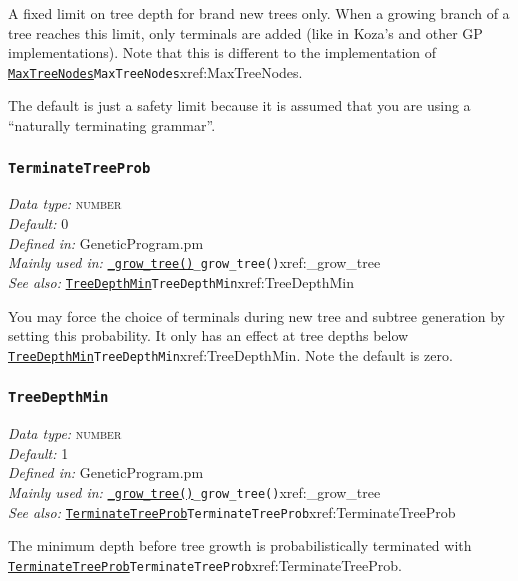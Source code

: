 \documentclass[a4paper]{article}
\begin{document}
A fixed limit on tree depth for brand new trees only.  When a growing
branch of a tree reaches this limit, only terminals are added (like in
Koza's and other GP implementations).  Note that this is different to
the implementation of \hyperref[no]{\texttt{MaxTreeNodes}}{\texttt{MaxTreeNodes}}{xref:MaxTreeNodes}.

The default is just a safety limit because it is assumed that you are
using a ``naturally terminating grammar''.

\subsubsection{\texttt{TerminateTreeProb}}\label{xref:TerminateTreeProb}
\begin{flushleft}
\textit{Data type:} \textsc{number}\\
\textit{Default:} 0\\
\textit{Defined in:} GeneticProgram.pm\\
\textit{Mainly used in:} \hyperref[no]{\texttt{\_grow\_tree()}}{\texttt{\_grow\_tree()}}{xref:_grow_tree}\\
\textit{See also:} \hyperref[no]{\texttt{TreeDepthMin}}{\texttt{TreeDepthMin}}{xref:TreeDepthMin}
\end{flushleft}

You may force the choice of terminals during new tree and subtree
generation by setting this probability.  It only has an effect at tree
depths below \hyperref[no]{\texttt{TreeDepthMin}}{\texttt{TreeDepthMin}}{xref:TreeDepthMin}.  Note the default is zero.

\subsubsection{\texttt{TreeDepthMin}}\label{xref:TreeDepthMin}
\begin{flushleft}
\textit{Data type:} \textsc{number}\\
\textit{Default:} 1\\
\textit{Defined in:} GeneticProgram.pm\\
\textit{Mainly used in:} \hyperref[no]{\texttt{\_grow\_tree()}}{\texttt{\_grow\_tree()}}{xref:_grow_tree}\\
\textit{See also:} \hyperref[no]{\texttt{TerminateTreeProb}}{\texttt{TerminateTreeProb}}{xref:TerminateTreeProb}
\end{flushleft}

The minimum depth before tree growth is probabilistically terminated
with \hyperref[no]{\texttt{TerminateTreeProb}}{\texttt{TerminateTreeProb}}{xref:TerminateTreeProb}.
\end{document}
